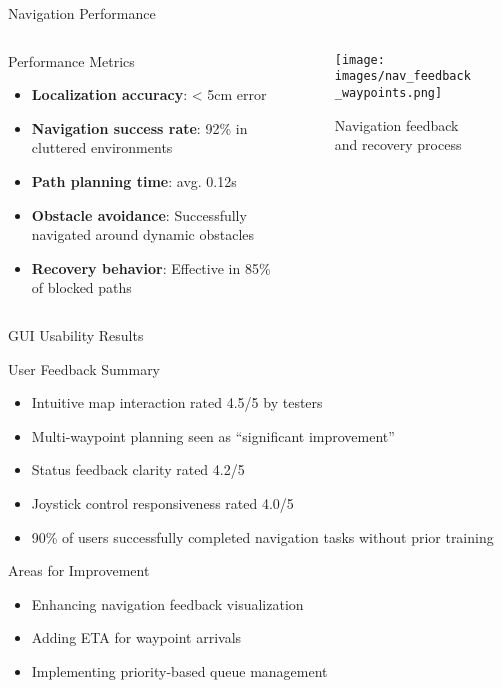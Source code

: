 \documentclass[aspectratio=169]{beamer}
\begin{document}
\begin{frame}{Navigation Performance}
	\begin{columns}
		\begin{column}{0.5\textwidth}
			\begin{block}{Performance Metrics}
				\begin{itemize}
					\item \textbf{Localization accuracy}: < 5cm error
					\item \textbf{Navigation success rate}: 92\% in cluttered environments
					\item \textbf{Path planning time}: avg. 0.12s
					\item \textbf{Obstacle avoidance}: Successfully navigated around dynamic obstacles
					\item \textbf{Recovery behavior}: Effective in 85\% of blocked paths
				\end{itemize}
			\end{block}
		\end{column}
		\begin{column}{0.2\textwidth}
			\begin{figure}
				\texttt{[image: images/nav\_feedback\_waypoints.png]}
				\caption{Navigation feedback and recovery process}
			\end{figure}
		\end{column}
	\end{columns}
\end{frame}

\begin{frame}{GUI Usability Results}
	\begin{exampleblock}{User Feedback Summary}
		\begin{itemize}
			\item Intuitive map interaction rated 4.5/5 by testers
			\item Multi-waypoint planning seen as ``significant improvement''
			\item Status feedback clarity rated 4.2/5
			\item Joystick control responsiveness rated 4.0/5
			\item 90\% of users successfully completed navigation tasks without prior training
		\end{itemize}
	\end{exampleblock}

	\begin{alertblock}{Areas for Improvement}
		\begin{itemize}
			\item Enhancing navigation feedback visualization
			\item Adding ETA for waypoint arrivals
			\item Implementing priority-based queue management
		\end{itemize}
	\end{alertblock}
\end{frame}
\end{document}
